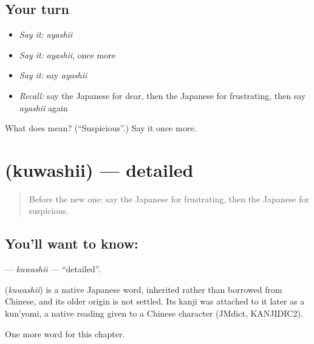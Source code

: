 \subsection*{Your turn}
\begin{itemize}
\raggedright
  \item \emph{Say it:} \emph{ayashii}
  \item \emph{Say it:} \emph{ayashii}, once more
  \item \emph{Say it:} say \emph{ayashii}
  \item \emph{Recall:} say the Japanese for dear, then the Japanese for frustrating, then say \emph{ayashii} again
\end{itemize}

\begin{tcolorbox}[breakable,colback=teal!4,colframe=teal!35!black,title={Before you move on}]
What does  mean? (\textquotedblleft{}Suspicious\textquotedblright{}.) Say it once more.
\end{tcolorbox}
\section[\texorpdfstring{\ja{くわしい} (kuwashii)}{くわしい (kuwashii)}]{ (kuwashii) — detailed}

\label{lesson:JA-C123-kuwashii}



\begin{quote}
Before the new one: say the Japanese for frustrating, then the Japanese for suspicious.
\end{quote}

\subsection*{You'll want to know: }
\textbf{} — \emph{kuwashii} — \textquotedblleft{}detailed\textquotedblright{}.

\begin{cousinweb}
\textbf{} (\emph{kuwashii}) is a native Japanese word, inherited rather than borrowed from Chinese, and its older origin is not settled. Its kanji was attached to it later as a kun'yomi, a native reading given to a Chinese character (JMdict, KANJIDIC2).
\end{cousinweb}

\begin{grammarlens}[title={What you've built}]
One more word for this chapter.
\end{grammarlens}

